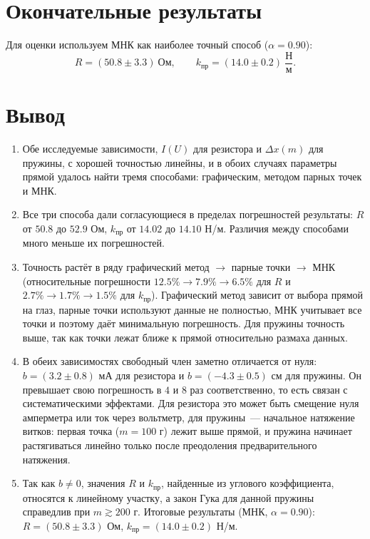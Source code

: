 \documentclass[12pt]{article}
\begin{document}
    \section{Окончательные результаты}

    Для оценки используем МНК как наиболее точный способ ($\alpha = 0.90$):
    \[
    	R = (50.8 \pm 3.3) \ \text{Ом}, \qquad k_{\text{пр}} = (14.0 \pm 0.2) \ \frac{\text{Н}}{\text{м}}.
    \]

    \section{Вывод}

    \begin{enumerate}
        \item Обе исследуемые зависимости, $I(U)$ для резистора и $\varDelta x(m)$ для пружины, с хорошей точностью линейны, и в обоих случаях параметры прямой удалось найти тремя способами: графическим, методом парных точек и МНК.
 
        \item Все три способа дали согласующиеся в пределах погрешностей результаты: $R$ от $50.8$ до $52.9$ Ом, $k_{\text{пр}}$ от $14.02$ до $14.10$ Н/м. Различия между способами много меньше их погрешностей.
 
        \item Точность растёт в ряду графический метод $\to$ парные точки $\to$ МНК (относительные погрешности $12.5\% \to 7.9\% \to 6.5\%$ для $R$ и $2.7\% \to 1.7\% \to 1.5\%$ для $k_{\text{пр}}$). Графический метод зависит от выбора прямой на глаз, парные точки используют данные не полностью, МНК учитывает все точки и поэтому даёт минимальную погрешность. Для пружины точность выше, так как точки лежат ближе к прямой относительно размаха данных.
 
        \item В обеих зависимостях свободный член заметно отличается от нуля: $b = (3.2 \pm 0.8)$ мА для резистора и $b = (-4.3 \pm 0.5)$ см для пружины. Он превышает свою погрешность в $4$ и $8$ раз соответственно, то есть связан с систематическими эффектами. Для резистора это может быть смещение нуля амперметра или ток через вольтметр, для пружины~--- начальное натяжение витков: первая точка ($m = 100$ г) лежит выше прямой, и пружина начинает растягиваться линейно только после преодоления предварительного натяжения.
 
        \item Так как $b \ne 0$, значения $R$ и $k_{\text{пр}}$, найденные из углового коэффициента, относятся к линейному участку, а закон Гука для данной пружины справедлив при $m \gtrsim 200$ г. Итоговые результаты (МНК, $\alpha = 0.90$): $R = (50.8 \pm 3.3)$ Ом, $k_{\text{пр}} = (14.0 \pm 0.2)$ Н/м.
    \end{enumerate}
\end{document}

